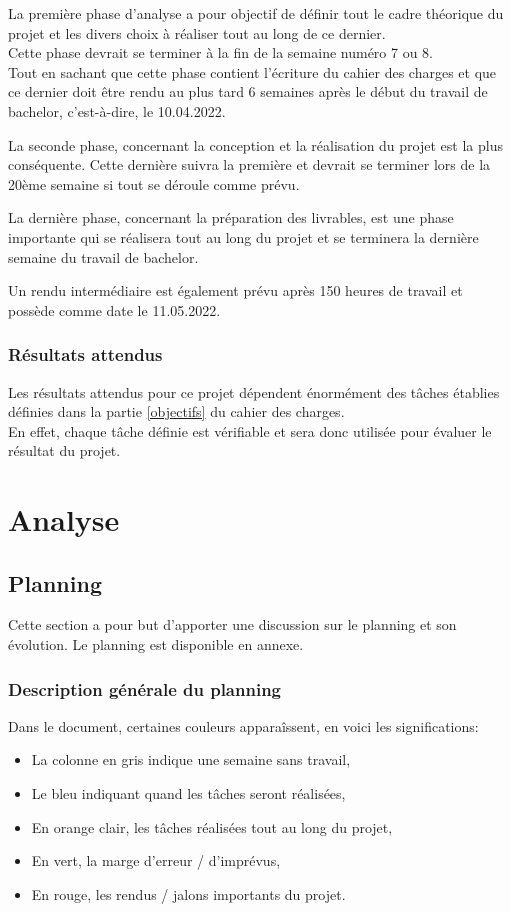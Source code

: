 \documentclass[
    iai, %
    il, %
]{heig-tb}
\begin{document}
La première phase d'analyse a pour objectif de définir tout le cadre théorique du projet et les divers choix à réaliser tout au long de ce dernier.\\
Cette phase devrait se terminer à la fin de la semaine numéro 7 ou 8.\\
Tout en sachant que cette phase contient l'écriture du cahier des charges et que ce dernier doit être rendu au plus tard 6 semaines après le début du travail de bachelor, c'est-à-dire, le 10.04.2022.

La seconde phase, concernant la conception et la réalisation du projet est la plus conséquente.
Cette dernière suivra la première et devrait se terminer lors de la 20ème semaine si tout se déroule comme prévu.

La dernière phase, concernant la préparation des livrables, est une phase importante qui se réalisera tout au long du projet et se terminera la dernière semaine du travail de bachelor.

Un rendu intermédiaire est également prévu après 150 heures de travail et possède comme date le 11.05.2022.

\subsection{Résultats attendus}

Les résultats attendus pour ce projet dépendent énormément des tâches établies définies dans la partie \ref{objectifs} du cahier des charges.\\
En effet, chaque tâche définie est vérifiable et sera donc utilisée pour évaluer le résultat du projet.
\newpage

\chapter{Analyse}

\section{Planning}
Cette section a pour but d'apporter une discussion sur le planning et son évolution.
Le planning est disponible en annexe.

\subsection{Description générale du planning}

Dans le document, certaines couleurs apparaîssent, en voici les significations:
\begin{itemize}
    \item La colonne en gris indique une semaine sans travail,
    \item Le bleu indiquant quand les tâches seront réalisées,
    \item En orange clair, les tâches réalisées tout au long du projet,
    \item En vert, la marge d'erreur / d'imprévus,
    \item En rouge, les rendus / jalons importants du projet.
\end{itemize}
\end{document}
